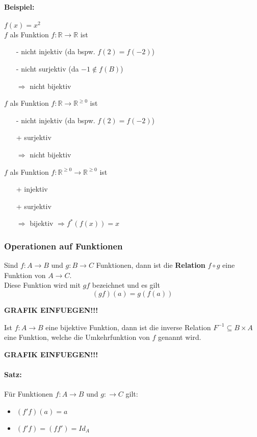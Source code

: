 \paragraph{Beispiel:}$f(x)=x^2$\\
$f$ als Funktion $f:\mathbb{R}\rightarrow\mathbb{R}$ ist
\begin{itemize}
\item[-] nicht injektiv (da bspw. $f(2)=f(-2)$)
\item[-] nicht surjektiv (da $-1\notin f(B)$)
\item[$\Rightarrow$] nicht bijektiv
\end{itemize}
$f$ als Funktion $f:\mathbb{R}\rightarrow\mathbb{R}^{\geq 0}$ ist
\begin{itemize}
\item[-] nicht injektiv (da bspw. $f(2)=f(-2)$)
\item[+] surjektiv
\item[$\Rightarrow$] nicht bijektiv
\end{itemize}
$f$ als Funktion $f:\mathbb{R}^{\geq 0}\rightarrow\mathbb{R}^{\geq 0}$ ist
\begin{itemize}
\item[+] injektiv
\item[+] surjektiv
\item[$\Rightarrow$] bijektiv $\Rightarrow f^{*}(f(x))=x$
\end{itemize}

\subsubsection{Operationen auf Funktionen}
\begin{defi}
Sind $f:A\rightarrow B$ und $g:B\rightarrow C$ Funktionen, dann ist die \textbf{Relation} $f\circ g$ eine Funktion von $A\rightarrow C$.\\
Diese Funktion wird mit $gf$ bezeichnet und es gilt
\[
(gf)(a)=g(f(a))
\]
\end{defi}
%
\textbf{GRAFIK EINFUEGEN!!!}
\begin{defi}[Umkehrfunktion]
Ist $f:A\rightarrow B$ eine bijektive Funktion, dann ist die inverse Relation $F^{-1}\subseteq B\times A$ eine Funktion, welche die Umkehrfunktion von $f$ genannt wird.
\end{defi}
\textbf{GRAFIK EINFUEGEN!!!}

\paragraph{Satz:}Für Funktionen $f:A\rightarrow B$ und $g:\rightarrow C$ gilt:
\begin{itemize}
\item $(f'f)(a)=a$
\item $(f'f)=(ff')=Id_A$
\end{itemize}
